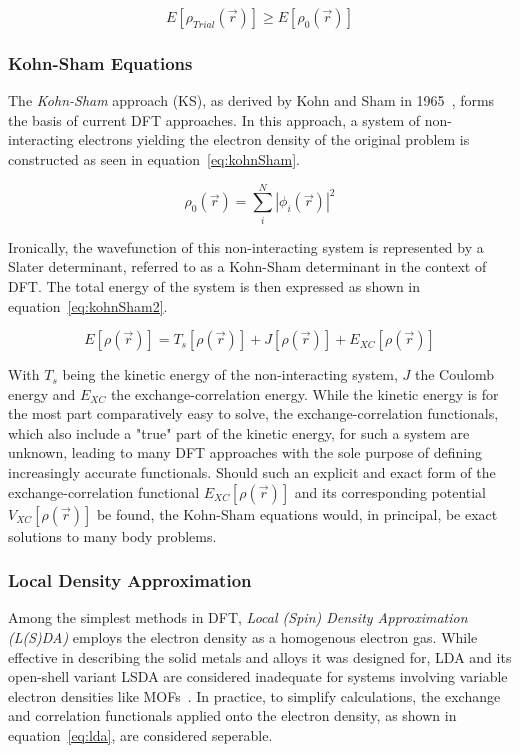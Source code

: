 \documentclass[12pt]{article}
\begin{document}
\begin{equation}
  E[\rho_{Trial}(\vec{r})] \geq E[\rho_{0}(\vec{r})]
  \label{eq:hohenbergKohn}
\end{equation}



\subsubsection{Kohn-Sham Equations}\label{kohnSham}

The \textit{Kohn-Sham} approach (KS), as derived by Kohn and Sham in 1965~\cite{Kohn1965}, forms the basis of current DFT approaches. 
In this approach, a system of non-interacting electrons yielding the electron density of the original problem is constructed as seen in equation~\ref{eq:kohnSham}.

\begin{equation}
  \rho_0(\vec{r}) = \sum_{i}^{N}|\phi_i(\vec{r})|^2
  \label{eq:kohnSham}
\end{equation}

\bigskip

\noindent Ironically, the wavefunction of this non-interacting system is represented by a Slater determinant, referred to as a Kohn-Sham determinant in the context of DFT.
The total energy of the system is then expressed as shown in equation~\ref{eq:kohnSham2}.

\begin{equation}
  E[\rho(\vec{r})] = T_s[\rho(\vec{r})] + J[\rho(\vec{r})] + E_{XC}[\rho(\vec{r})]
  \label{eq:kohnSham2}
\end{equation}

\bigskip

\noindent With $T_s$ being the kinetic energy of the non-interacting system, $J$ the Coulomb energy and $E_{XC}$ the exchange-correlation energy.
While the kinetic energy is for the most part comparatively easy to solve, the exchange-correlation functionals, which also include a "true" part of the kinetic energy, for such a system are unknown, leading to many DFT approaches with the sole purpose of defining increasingly accurate functionals.
Should such an explicit and exact form of the exchange-correlation functional $E_{XC}[\rho(\vec{r})]$ and its corresponding potential $V_{XC}[\rho(\vec{r})]$ be found, the Kohn-Sham equations would, in principal, be exact solutions to many body problems.

\subsubsection{Local Density Approximation}
Among the simplest methods in DFT, \textit{Local (Spin) Density Approximation (L(S)DA)} employs the electron density as a homogenous electron gas.
While effective in describing the solid metals and alloys it was designed for, LDA and its open-shell variant LSDA are considered inadequate for systems involving variable electron densities like MOFs~\cite{Perdew1981}.
In practice, to simplify calculations, the exchange and correlation functionals applied onto the electron density, as shown in equation~\ref{eq:lda}, are considered seperable.
\end{document}
